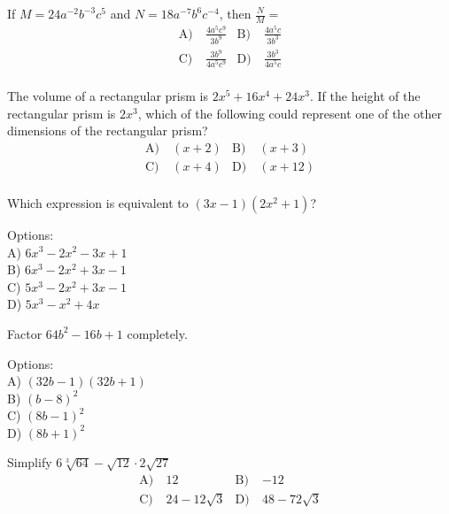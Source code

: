 \begin{problem}\label{Alg5}
If $M=24a^{-2}b^{-3}c^5$ and $N=18a^{-7}b^6c^{-4}$, then $\frac{N}{M}=$
\begin{align*}
\text{A)}\ & \frac{4a^5c^9}{3b^9} &
\text{B)}\ & \frac{4a^5c}{3b^3} \\
\text{C)}\ & \frac{3b^9}{4a^5c^9}  &
\text{D)}\ & \frac{3b^3}{4a^5c}\\
\end{align*} 
\end{problem}

\begin{problem}\label{Alg6}
The volume of a rectangular prism is $2x^5 + 16x^4 + 24x^3$. If the height of the rectangular prism is $2x^3$, which of the following could represent one of the other dimensions of the rectangular prism?
\begin{align*}
\text{A)}\ & (x+2) &
\text{B)}\ & (x+3) \\
\text{C)}\ & (x+4)  &
\text{D)}\ & (x+12)\\
\end{align*}

\end{problem}


\begin{problem}\label{AI-Algebra2}
Which expression is equivalent to $(3x - 1)(2x^2 + 1)$?

\noindent Options:\\
A) $6x^3 - 2x^2 - 3x + 1$\\
B) $6x^3 - 2x^2 + 3x - 1$\\
C) $5x^3 - 2x^2 + 3x - 1$\\
D) $5x^3 - x^2 + 4x$
\end{problem}

\begin{problem}\label{AI-Algebra3}
Factor \( 64b^2 - 16b + 1 \) completely.

\noindent Options:\\
A) \( (32b - 1)(32b + 1) \)\\
B) \( (b - 8)^2 \)\\
C) \( (8b - 1)^2 \)\\
D) \( (8b + 1)^2 \)
\end{problem}

\begin{problem}\label{Alg9}
Simplify $6\sqrt[3]{64}-\sqrt{12}\cdot 2\sqrt{27}$
\begin{align*}
\text{A)}\ & 12  &
\text{B)}\ & -12  \\
\text{C)}\ & 24-12\sqrt{3}  &
\text{D)}\ & 48-72\sqrt{3}\\
\end{align*}
\end{problem}

